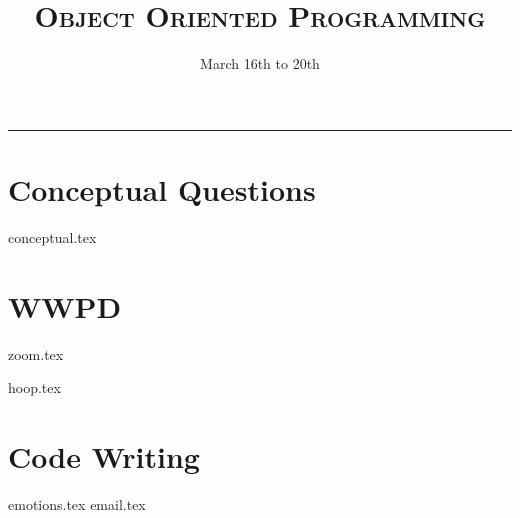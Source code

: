 \documentclass{exam}
\title{\textsc{Object Oriented Programming}}
\date{March 16th to 20th}
\begin{document}
\maketitle
\rule{\textwidth}{0.15em}
\fontsize{12}{15}\selectfont


\begin{questions}
\section{Conceptual Questions}
{conceptual.tex}

\newpage
\section{WWPD}

{zoom.tex}
\newpage

{hoop.tex}
\newpage

\section{Code Writing}

{emotions.tex}
\newline
{email.tex}

\end{questions}
\end{document}
